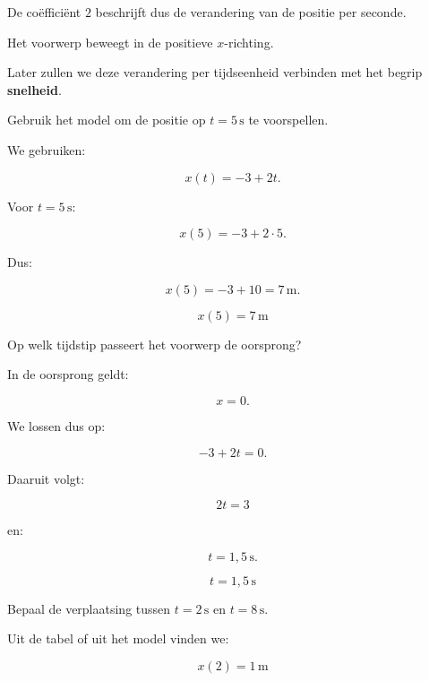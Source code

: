 \documentclass{ximera}
\begin{document}
\begin{oefening}{\oefU\ESS}
\begin{question}
\begin{oplossing}
  De coëfficiënt $2$ beschrijft dus de verandering van de positie per seconde.
  
  Het voorwerp beweegt in de positieve $x$-richting.
  
  Later zullen we deze verandering per tijdseenheid verbinden met het begrip
  \textbf{snelheid}.
  \end{oplossing}
  \end{question}
  
  
  \begin{question}
  Gebruik het model om de positie op $t=5\,\mathrm{s}$ te voorspellen.
  
  \begin{oplossing}
  We gebruiken:
  
  \[
  x(t)=-3+2t.
  \]
  
  Voor $t=5\,\mathrm{s}$:
  
  \[
  x(5)
  =
  -3+2\cdot5.
  \]
  
  Dus:
  
  \[
  x(5)
  =
  -3+10
  =
  7\,\mathrm{m}.
  \]
  
  \[
  \boxed{x(5)=7\,\mathrm{m}}
  \]
  \end{oplossing}
  \end{question}
  
  
  \begin{question}
  Op welk tijdstip passeert het voorwerp de oorsprong?
  
  \begin{oplossing}
  In de oorsprong geldt:
  
  \[
  x=0.
  \]
  
  We lossen dus op:
  
  \[
  -3+2t=0.
  \]
  
  Daaruit volgt:
  
  \[
  2t=3
  \]
  
  en:
  
  \[
  t=1{,}5\,\mathrm{s}.
  \]
  
  \[
  \boxed{t=1{,}5\,\mathrm{s}}
  \]
  \end{oplossing}
  \end{question}
  
  
  \begin{question}
  Bepaal de verplaatsing tussen $t=2\,\mathrm{s}$ en $t=8\,\mathrm{s}$.
  
  \begin{oplossing}
  Uit de tabel of uit het model vinden we:
  
  \[
  x(2)=1\,\mathrm{m}
  \]
  

\end{oplossing}
\end{question}
\end{oefening}
\end{document}
